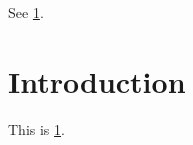 \documentclass{amsart}
\begin{document}

See \cref{sec:intro}.

\section{Introduction}
\label{sec:intro}

This is \cref{sec:intro}.
\end{document}
